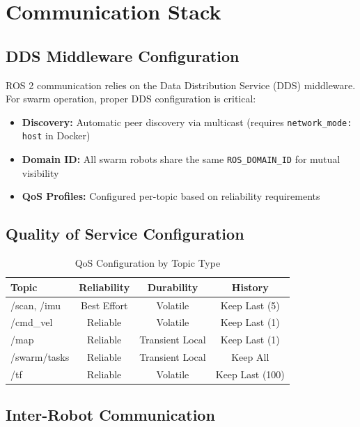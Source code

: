\section{Communication Stack}
\label{sec:communication}

\subsection{DDS Middleware Configuration}

ROS 2 communication relies on the Data Distribution Service (DDS) middleware. For swarm operation, proper DDS configuration is critical:

\begin{itemize}
    \item \textbf{Discovery:} Automatic peer discovery via multicast (requires \texttt{network\_mode: host} in Docker)
    \item \textbf{Domain ID:} All swarm robots share the same \texttt{ROS\_DOMAIN\_ID} for mutual visibility
    \item \textbf{QoS Profiles:} Configured per-topic based on reliability requirements
\end{itemize}

\subsection{Quality of Service Configuration}

\begin{table}[H]
\centering
\caption{QoS Configuration by Topic Type}
\label{tab:qos_config}
\begin{tabular}{|l|c|c|c|}
\hline
\textbf{Topic} & \textbf{Reliability} & \textbf{Durability} & \textbf{History} \\
\hline
/scan, /imu & Best Effort & Volatile & Keep Last (5) \\
/cmd\_vel & Reliable & Volatile & Keep Last (1) \\
/map & Reliable & Transient Local & Keep Last (1) \\
/swarm/tasks & Reliable & Transient Local & Keep All \\
/tf & Reliable & Volatile & Keep Last (100) \\
\hline
\end{tabular}
\end{table}

\subsection{Inter-Robot Communication}

